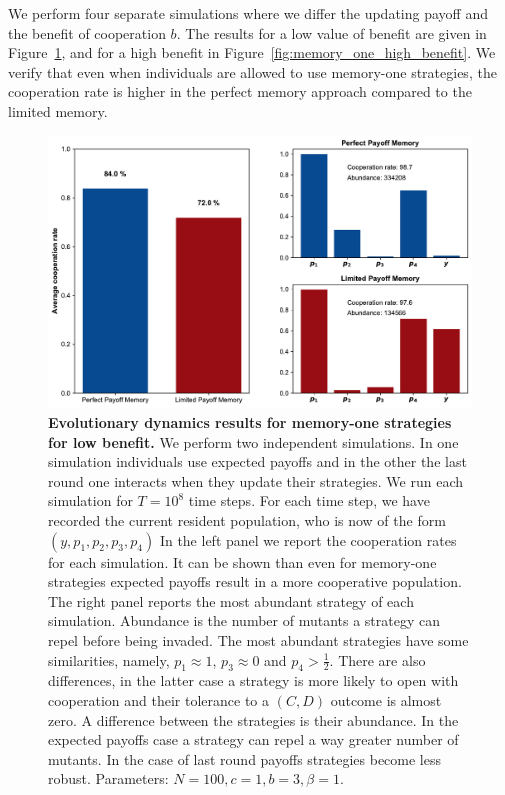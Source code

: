 \documentclass[11pt]{article}
\theoremstyle{plainCl1}
\theoremstyle{plainCl2}
\begin{document}
We perform four separate simulations where we differ the updating payoff and the
benefit of cooperation \(b\). The results for a low value of benefit are given
in Figure~\ref{fig:memory_one_low_benefit}, and for a high benefit in
Figure~\ref{fig:memory_one_high_benefit}. We verify that even when individuals
are allowed to use memory-one strategies, the cooperation rate is higher
in the perfect memory approach compared to the limited memory.

\begin{figure}[!htbp]
  \centering 
  \includegraphics[width=\textwidth]{static/memory_one_results_low_benefit.pdf}
  \caption{\textbf{Evolutionary dynamics results for memory-one strategies for low benefit.}
  We perform two independent simulations. In one simulation individuals use
  expected payoffs and in the other the last round one interacts when they
  update their strategies. We run each simulation for \(T = 10^8\) time steps.
  For each time step, we have recorded the current resident population, who is
  now of the form  \((y, p_1, p_2, p_3, p_4)\) In the left panel we report the
  cooperation rates for each simulation. It can be shown than even for
  memory-one strategies expected payoffs result in a more cooperative
  population. The right panel reports the most abundant strategy of each
  simulation. Abundance is the number of mutants a strategy can repel before
  being invaded. The most abundant strategies have some similarities,
  namely, \(p_1 \approx 1\), \(p_3 \approx 0\) and \(p_4 > \frac{1}{2}\). There are also differences, in the latter
  case a strategy is more likely to open with cooperation and their tolerance to
  a \((C, D)\) outcome is almost zero. A difference between the strategies is their
  abundance. In the expected payoffs case a strategy can repel a way greater
  number of mutants. In the case of last round payoffs strategies become less
  robust. Parameters: \(N =100, c=1, b=3, \beta=1\).}\label{fig:memory_one_low_benefit}
\end{figure}
\end{document}
